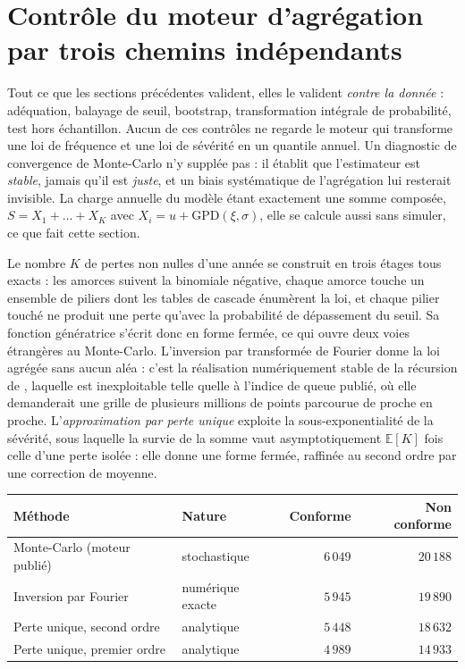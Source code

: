 \section{Contrôle du moteur d'agrégation par trois chemins indépendants}

Tout ce que les sections précédentes valident, elles le valident \emph{contre la donnée} :
adéquation, balayage de seuil, bootstrap, transformation intégrale de probabilité, test hors
échantillon. Aucun de ces contrôles ne regarde le moteur qui transforme une loi de fréquence et
une loi de sévérité en un quantile annuel. Un diagnostic de convergence de Monte-Carlo n'y
supplée pas : il établit que l'estimateur est \emph{stable}, jamais qu'il est \emph{juste}, et un
biais systématique de l'agrégation lui resterait invisible. La charge annuelle du modèle étant
exactement une somme composée, $S=X_1+\dots+X_K$ avec $X_i = u + \mathrm{GPD}(\xi,\sigma)$, elle
se calcule aussi sans simuler, ce que fait cette section.

Le nombre $K$ de pertes non nulles d'une année se construit en trois étages tous exacts : les
amorces suivent la binomiale négative, chaque amorce touche un ensemble de piliers dont les
tables de cascade énumèrent la loi, et chaque pilier touché ne produit une perte qu'avec la
probabilité de dépassement du seuil. Sa fonction génératrice s'écrit donc en forme fermée, ce qui
ouvre deux voies étrangères au Monte-Carlo. L'inversion par transformée de Fourier donne
la loi agrégée sans aucun aléa : c'est la réalisation numériquement stable de la récursion de
\citet{panjer1981} \citep{embrechtsfrei2009}, laquelle est inexploitable telle quelle à l'indice de
queue publié, où elle demanderait une grille de plusieurs millions de points parcourue de proche en
proche. L'\emph{approximation par perte unique} \citep{bockerkluppelberg2005} exploite la sous-exponentialité de la sévérité, sous laquelle la survie de la somme vaut
asymptotiquement $\mathbb{E}[K]$ fois celle d'une perte isolée : elle donne une forme fermée,
raffinée au second ordre par une correction de moyenne.

\begin{center}\footnotesize
\renewcommand{\arraystretch}{1.25}
\begin{tabular}{@{}l l r r@{}}
\toprule
\textbf{Méthode} & \textbf{Nature} & \textbf{Conforme} & \textbf{Non conforme} \\
\midrule
Monte-Carlo (moteur publié) & stochastique & $6\,049$ & $20\,188$ \\
Inversion par Fourier & numérique exacte & $5\,945$ & $19\,890$ \\
Perte unique, second ordre & analytique & $5\,448$ & $18\,632$ \\
Perte unique, premier ordre & analytique & $4\,989$ & $14\,933$ \\
\bottomrule
\end{tabular}
\end{center}

